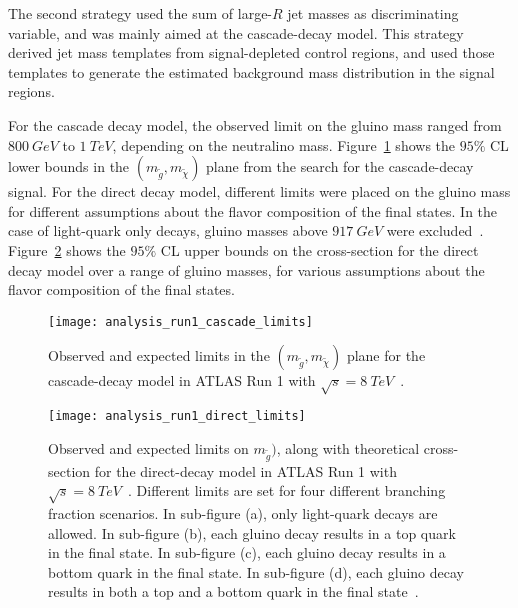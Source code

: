The second strategy used the sum of large-$R$ jet masses as discriminating variable, and was mainly aimed at the cascade-decay model.
This strategy derived jet mass templates from signal-depleted control regions, and used those templates to generate the estimated background mass distribution in the signal regions.

For the cascade decay model, the observed limit on the gluino mass ranged from $800~GeV$ to $1~TeV$, depending on the neutralino mass.
Figure~\ref{fig:run1_cascade_limits} shows the $95\%$ CL lower bounds in the $(m_{\tilde{g}}, m_{\tilde{\chi}})$ plane from the search for the cascade-decay signal.
For the direct decay model, different limits were placed on the gluino mass for different assumptions about the flavor composition of the final states.
In the case of light-quark only decays, gluino masses above $917~GeV$ were excluded~\cite{run1-multijet}.
Figure~\ref{fig:run1_direct_limits} shows the $95\%$ CL upper bounds on the cross-section for the direct decay model over a range of gluino masses, for various assumptions about the flavor composition of the final states.

\begin{figure}[!ht]\centering
    \texttt{[image: analysis\_run1\_cascade\_limits]}
    \caption{Observed and expected limits in the $(m_{\tilde{g}}, m_{\tilde{\chi}})$ plane for the cascade-decay model in ATLAS Run 1 with $\sqrt{s}=8~TeV$~\cite{run1-multijet}.
    }
    \label{fig:run1_cascade_limits}
\end{figure}

\begin{figure}[!ht]\centering
    \texttt{[image: analysis\_run1\_direct\_limits]}
    \caption{Observed and expected limits on $m_{\tilde{g}})$, along with theoretical cross-section for the direct-decay model in ATLAS Run 1 with $\sqrt{s}=8~TeV$~\cite{run1-multijet}.
    Different limits are set for four different branching fraction scenarios.
    In sub-figure (a), only light-quark decays are allowed.
    In sub-figure (b), each gluino decay results in a top quark in the final state.
    In sub-figure (c), each gluino decay results in a bottom quark in the final state.
    In sub-figure (d), each gluino decay results in both a top and a bottom quark in the final state~\cite{run1-multijet}.}
    \label{fig:run1_direct_limits}
\end{figure}

